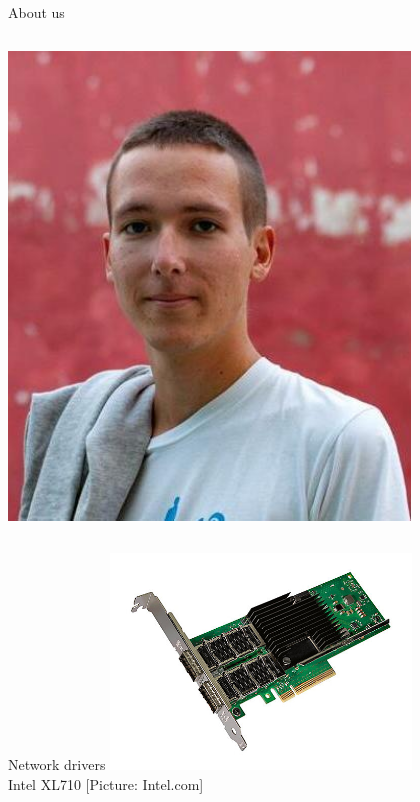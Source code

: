 \documentclass[NET,english,aspectratio=169,notitleframe]{tumbeamer}
\begin{document}
\begin{frame}{About us}
\begin{columns}
\begin{column}{0.15\textwidth}
\includegraphics[width=0.8\textwidth]{pics/simon.jpg}\\
\end{column}
\end{columns}
\end{frame}


\begin{frame}{Network drivers}
\centering\includegraphics[width=0.60\textwidth]{pics/nic3}\\
\vspace{-1em}\tiny{Intel XL710 [Picture: Intel.com]}
\end{frame}
\end{document}
